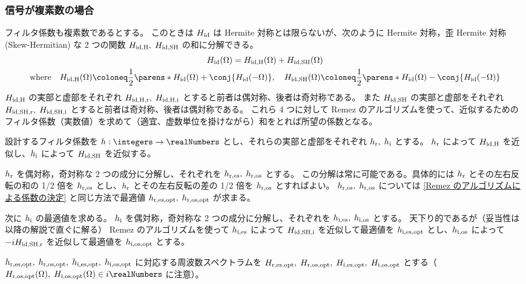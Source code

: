         \subsubsection{信号が複素数の場合}
            フィルタ係数も複素数であるとする。
            このときは $H_{\text{id}}$ は Hermite 対称とは限らないが、次のように Hermite 対称，歪 Hermite 対称 (Skew-Hermitian) な 2 つの関数 $H_{\text{id,H}},\;H_{\text{id,SH}}$ の和に分解できる。
            \begin{gather*}
                \Hid(\Omega) = \HidH(\Omega) + \HidSH(\Omega) \\
                \text{where}\quad\HidH(\Omega)\coloneq\frac{1}{2}\parens*{\Hid(\Omega) + \conj{\Hid(-\Omega)}},\quad\HidSH(\Omega)\coloneq\frac{1}{2}\parens*{\Hid(\Omega) - \conj{\Hid(-\Omega)}}
            \end{gather*}
            $H_{\text{id,H}}$ の実部と虚部をそれぞれ $H_{\text{id,H,r}},\;H_{\text{id,H,i}}$ とすると前者は偶対称、後者は奇対称である。
            また $H_{\text{id,SH}}$ の実部と虚部をそれぞれ $H_{\text{id,SH,r}},\;H_{\text{id,SH,i}}$ とすると前者は奇対称、後者は偶対称である。
            これら 4 つに対して Remez のアルゴリズムを使って、近似するためのフィルタ係数（実数値）を求めて（適宜、虚数単位を掛けながら）和をとれば所望の係数となる。
            \par
            設計するフィルタ係数を $h:\integers\to\realNumbers$ とし、それらの実部と虚部をそれぞれ $h_{\text{r}},\;h_{\text{i}}$ とする。
            $h_{\text{r}}$ によって $H_{\text{id,H}}$ を近似し、$h_{\text{i}}$ によって $H_{\text{id,SH}}$ を近似する。
            \par
            $h_{\text{r}}$ を偶対称，奇対称な 2 つの成分に分解し、それぞれを $h_{\text{r,es}},\;h_{\text{r,os}}$ とする。
            この分解は常に可能である。具体的には $h_{\text{r}}$ とその左右反転の和の 1/2 倍を $h_{\text{r,es}}$ とし、$h_{\text{r}}$ とその左右反転の差の 1/2 倍を $h_{\text{r,os}}$ とすればよい。
            $h_{\text{r,es}},\;h_{\text{r,os}}$ については \ref{Remez のアルゴリズムによる係数の決定} と同じ方法で最適値 $h_{\text{r,es,opt}},\;h_{\text{r,os,opt}}$ が求まる。
            \par
            次に $h_{\text{i}}$ の最適値を求める。
            $h_{\text{i}}$ を偶対称，奇対称な 2 つの成分に分解し、それぞれを $h_{\text{i,es}},\;h_{\text{i,os}}$ とする。
            天下り的であるが（妥当性は以降の解説で直ぐに解る） Remez のアルゴリズムを使って $h_{\text{i,es}}$ によって $H_{\text{id,SH,i}}$ を近似して最適値を $h_{\text{i,es,opt}}$ とし、$h_{\text{i,os}}$ によって $-iH_{\text{id,SH,r}}$ を近似して最適値を $h_{\text{i,os,opt}}$ とする。
            \par
            $h_{\text{r,es,opt}},\;h_{\text{r,os,opt}},\;h_{\text{i,es,opt}},\;h_{\text{i,os,opt}}$ に対応する周波数スペクトラムを $H_{\text{r,es,opt}},\;H_{\text{r,os,opt}},\;H_{\text{i,es,opt}},\;H_{\text{i,os,opt}}$ とする（$\HrOsOpt(\Omega),\;\HiOsOpt(\Omega)\in i\realNumbers$ に注意）。
